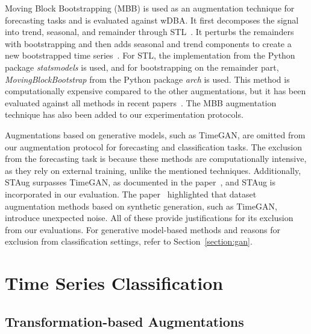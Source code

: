 


Moving Block Bootstrapping (MBB) is used as an augmentation technique for forecasting tasks and is evaluated against wDBA. It first decomposes the signal into trend, seasonal, and remainder through STL~\cite{cleveland1990stl}. It perturbs the remainders with bootstrapping and then adds seasonal and trend components to create a new bootstrapped time series~\cite{mbb, BERGMEIR2016303}. For STL, the implementation from the Python package \textit{statsmodels} is used, and for bootstrapping on the remainder part, \textit{MovingBlockBootstrap} from the Python package \textit{arch} is used. This method is computationally expensive compared to the other augmentations, but it has been evaluated against all methods in recent papers~\cite{chen2023fraugfrequencydomainaugmentation, zhao2024dominantshufflesimplepowerful, zhang2023diversecoherentaugmentationtimeseries}. The MBB augmentation technique has also been added to our experimentation protocols.


Augmentations based on generative models, such as TimeGAN, are omitted from our augmentation protocol for forecasting and classification tasks. The exclusion from the forecasting task is because these methods are computationally intensive, as they rely on external training, unlike the mentioned techniques. Additionally, STAug surpasses TimeGAN, as documented in the paper~\cite{zhang2023diversecoherentaugmentationtimeseries}, and STAug is incorporated in our evaluation. The paper~\cite{chen2023fraugfrequencydomainaugmentation} highlighted that dataset augmentation methods based on synthetic generation, such as TimeGAN, introduce unexpected noise. All of these provide justifications for its exclusion from our evaluations. For generative model-based methods and reasons for exclusion from classification settings, refer to Section~\ref{section:gan}.






\section{Time Series Classification} \label{sec: tsc_related}

\subsection{Transformation-based Augmentations} \label{section:transformation2}



